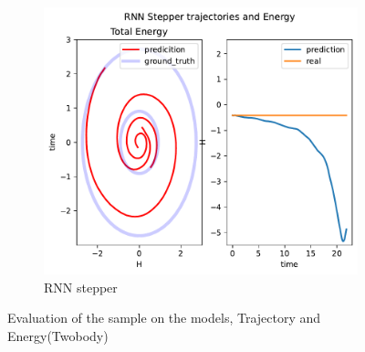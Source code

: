 \begin{figure}[H]
\begin{subfigure}[b]{0.3\textwidth}
		\centering
		\includegraphics[width=\textwidth]{chapters/chapter5/body2_rne_traj.pdf}
		\caption{RNN stepper}
	\end{subfigure}
	
	\caption{Evaluation of the sample on the models, Trajectory and Energy(Twobody)}
\end{figure}

